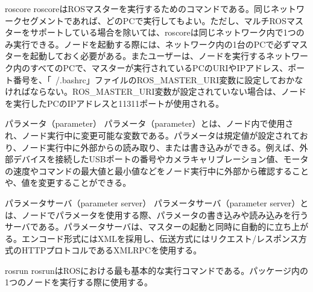 
\begin{term}{roscore}
roscoreはROSマスターを実行するためのコマンドである。同じネットワークセグメントであれば、どのPCで実行してもよい。ただし、マルチROSマスターをサポートしている場合を除いては、roscoreは同じネットワーク内で1つのみ実行できる。ノードを起動する際には、ネットワーク内の1台のPCで必ずマスターを起動しておく必要がある。またユーザーは、ノードを実行するネットワーク内のすべてのPCで、マスターが実行されているPCのURIやIPアドレス、ポート番号を、「~/.bashrc」ファイルのROS\_MASTER\_URI変数に設定しておかなければならない。ROS\_MASTER\_URI変数が設定されていない場合は、ノードを実行したPCのIPアドレスと11311ポートが使用される。
\end{term}


\begin{term}{パラメータ（parameter）}
パラメータ（parameter）とは、ノード内で使用され、ノード実行中に変更可能な変数である。パラメータは規定値が設定されており、ノード実行中に外部からの読み取り、または書き込みができる。例えば、外部デバイスを接続したUSBポートの番号やカメラキャリブレーション値、モータの速度やコマンドの最大値と最小値などをノード実行中に外部から確認することや、値を変更することができる。
\end{term}


\begin{term}{パラメータサーバ（parameter server）}
パラメータサーバ（parameter server）とは、ノードでパラメータを使用する際、パラメータの書き込みや読み込みを行うサーバである。パラメータサーバは、マスターの起動と同時に自動的に立ち上がる。エンコード形式にはXMLを採用し、伝送方式にはリクエスト/レスポンス方式のHTTPプロトコルであるXMLRPCを使用する。
\end{term}


\begin{term}{rosrun}
rosrunはROSにおける最も基本的な実行コマンドである。パッケージ内の1つのノードを実行する際に使用する。
\end{term}

